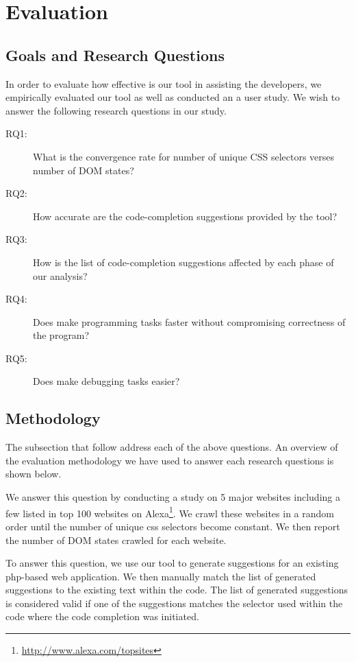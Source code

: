 \section{Evaluation}
\label{Sec:Evaluation}

	\subsection{Goals and Research Questions}
	\label{Sec:Goals}
	In order to evaluate how effective is our tool in assisting the developers, we empirically evaluated our tool as well as conducted an a user study. We wish to answer the following research questions in our study.
	\begin{description}
		\item[RQ1:] What is the convergence rate for number of unique CSS selectors verses number of DOM states?
		\item[RQ2:] How accurate are the code-completion suggestions provided by the tool?
		\item[RQ3:] How is the list of code-completion suggestions affected by each phase of our analysis?
		\item[RQ4:] Does \dompletion make programming tasks faster without compromising correctness of the program?
		\item[RQ5:] Does \dompletion make debugging tasks easier?
		
	\end{description}
	
	\subsection{Methodology}
	\label{Sec:Methodology}
	The subsection that follow address each of the above questions. An overview of the evaluation methodology we have used to answer each research questions is shown below.
	
	 We answer this question by conducting a study on 5 major websites including a few listed in top 100 websites on Alexa\footnote{\url{http://www.alexa.com/topsites}}. We crawl these websites in a random order until the number of unique css selectors become constant.  We then report the number of DOM states crawled for each website.
	
	 To answer this question, we use our tool to generate suggestions for an existing php-\javascript based web application. We then manually match the list of generated suggestions to the existing text within the \javascript code. The list of generated suggestions is considered valid if one of the suggestions matches the \css selector used within the code where the code completion was initiated.
	
